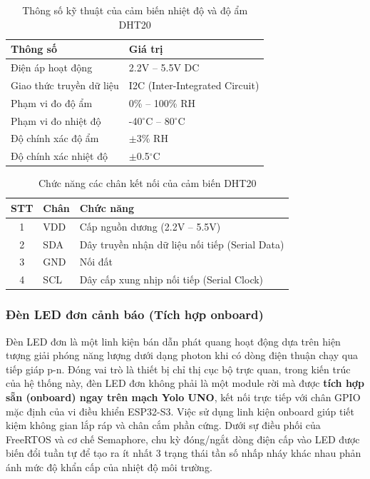 \begin{table}[H]
    \centering
    \caption{Thông số kỹ thuật của cảm biến nhiệt độ và độ ẩm DHT20}
    \begin{tabular}{|l|l|}
    \hline
    \textbf{Thông số} & \textbf{Giá trị} \\ \hline
    Điện áp hoạt động & 2.2V -- 5.5V DC \\ \hline
    Giao thức truyền dữ liệu & I2C (Inter-Integrated Circuit) \\ \hline
    Phạm vi đo độ ẩm & 0\% -- 100\% RH \\ \hline
    Phạm vi đo nhiệt độ & -40$^{\circ}$C -- 80$^{\circ}$C \\ \hline
    Độ chính xác độ ẩm & $\pm$3\% RH \\ \hline
    Độ chính xác nhiệt độ & $\pm$0.5$^{\circ}$C \\ \hline
    \end{tabular}
\end{table}

\begin{table}[H]
    \centering
    \caption{Chức năng các chân kết nối của cảm biến DHT20}
    \begin{tabular}{|c|l|l|}
    \hline
    \textbf{STT} & \textbf{Chân} & \textbf{Chức năng} \\ \hline
    1 & VDD & Cấp nguồn dương (2.2V -- 5.5V) \\ \hline
    2 & SDA & Dây truyền nhận dữ liệu nối tiếp (Serial Data) \\ \hline
    3 & GND & Nối đất \\ \hline
    4 & SCL & Dây cấp xung nhịp nối tiếp (Serial Clock) \\ \hline
    \end{tabular}
\end{table}

\subsubsection{Đèn LED đơn cảnh báo (Tích hợp onboard)}
Đèn LED đơn là một linh kiện bán dẫn phát quang hoạt động dựa trên hiện tượng giải phóng năng lượng dưới dạng photon khi có dòng điện thuận chạy qua tiếp giáp p-n. Đóng vai trò là thiết bị chỉ thị cục bộ trực quan, trong kiến trúc của hệ thống này, đèn LED đơn không phải là một module rời mà được \textbf{tích hợp sẵn (onboard) ngay trên mạch Yolo UNO}, kết nối trực tiếp với chân GPIO mặc định của vi điều khiển ESP32-S3. Việc sử dụng linh kiện onboard giúp tiết kiệm không gian lắp ráp và chân cắm phần cứng. Dưới sự điều phối của FreeRTOS và cơ chế Semaphore, chu kỳ đóng/ngắt dòng điện cấp vào LED được biến đổi tuần tự để tạo ra ít nhất 3 trạng thái tần số nhấp nháy khác nhau phản ánh mức độ khẩn cấp của nhiệt độ môi trường.

